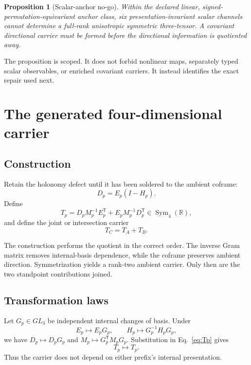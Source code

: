 \documentclass[11pt]{article}
\newtheorem{proposition}[theorem]{Proposition}
\theoremstyle{definition}
\theoremstyle{remark}
\newcommand{\Sym}{\operatorname{Sym}}
\begin{document}
\begin{proposition}[Scalar-anchor no-go]\label{prop:nogo}
Within the declared linear, signed-permutation-equivariant anchor class, six presentation-invariant scalar channels cannot determine a full-rank anisotropic symmetric three-tensor. A covariant directional carrier must be formed before the directional information is quotiented away.
\end{proposition}

The proposition is scoped. It does not forbid nonlinear maps, separately typed scalar observables, or enriched covariant carriers. It instead identifies the exact repair used next.

\section{The generated four-dimensional carrier}

\subsection{Construction}

Retain the holonomy defect until it has been soldered to the ambient coframe:
\begin{equation}\label{eq:defect}
 D_p=E_p(I-H_p).
\end{equation}
Define
\begin{equation}\label{eq:Tp}
 T_p=D_pM_p^{-1}E_p^{\mathsf T}
     +E_pM_p^{-1}D_p^{\mathsf T}\in\Sym_4(\mathbb R),
\end{equation}
and define the joint or intersection carrier
\begin{equation}\label{eq:Tjoint}
 T_C=T_A+T_B.
\end{equation}

The construction performs the quotient in the correct order. The inverse Gram matrix removes internal-basis dependence, while the coframe preserves ambient direction. Symmetrization yields a rank-two ambient carrier. Only then are the two standpoint contributions joined.

\subsection{Transformation laws}

Let $G_p\in GL_3$ be independent internal changes of basis. Under
\begin{equation}\label{eq:internalgauge}
 E_p\mapsto E_pG_p,\qquad
 H_p\mapsto G_p^{-1}H_pG_p,
\end{equation}
we have $D_p\mapsto D_pG_p$ and $M_p\mapsto G_p^{\mathsf T}M_pG_p$. Substitution in Eq.~\eqref{eq:Tp} gives
\begin{equation}\label{eq:gaugeinvariance}
 T_p\mapsto T_p.
\end{equation}
Thus the carrier does not depend on either prefix's internal presentation.
\end{document}
